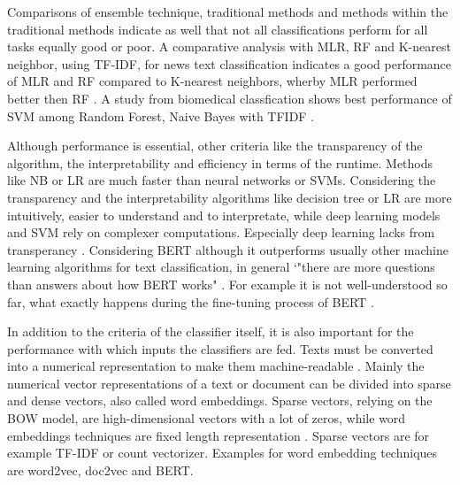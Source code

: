 \documentclass[12pt, a4paper, titlepage]{article}
\begin{document}
Comparisons of ensemble technique, traditional methods and methods within the traditional methods indicate as well that not all classifications perform for all tasks equally good or poor. A comparative analysis with \ac{MLR}, \ac{RF} and K-nearest neighbor, using \ac{TF-IDF}, for news text classification indicates a good performance of \ac{MLR} and \ac{RF} compared to K-nearest neighbors, wherby \ac{MLR} performed better then \ac{RF} \citep{shah2020}. A study from biomedical classfication shows best performance of SVM among Random Forest, Naive Bayes with TFIDF \citep{danso2014}. 

Although performance is essential, other criteria like the transparency of the algorithm, the interpretability and efficiency in terms of the runtime. Methods like \ac{NB} or \ac{LR} are much faster than neural networks or \ac{SVM}s. Considering the transparency and the interpretability algorithms like decision tree or \ac{LR} are more intuitively, easier to understand and to interpretate, while deep learning models and \ac{SVM} rely on complexer computations. Especially deep learning lacks from transperancy \citep{maglogiannis2007}. Considering \ac{BERT} although it outperforms usually other machine learning algorithms for text classification, in general `"there are more questions than answers about how BERT works" \citep[853]{rogers2020}. For example it is not well-understood so far, what exactly happens during the fine-tuning process of \ac{BERT} \citep{merchant2020}. 

In addition to the criteria of the classifier itself, it is also important for the performance with which inputs the classifiers are fed. Texts must be converted into a numerical representation to make them machine-readable \citep{singh2019}. Mainly the numerical vector representations of a text or document can be divided into sparse and dense vectors, also called word embeddings. Sparse vectors, relying on the \ac{BOW} model, are high-dimensional vectors with a lot of zeros, while word embeddings techniques are fixed length representation \citep{almeida2019}. Sparse vectors are for example \ac{TF-IDF} or count vectorizer. Examples for word embedding techniques are word2vec, doc2vec and \ac{BERT}. 
\end{document}
